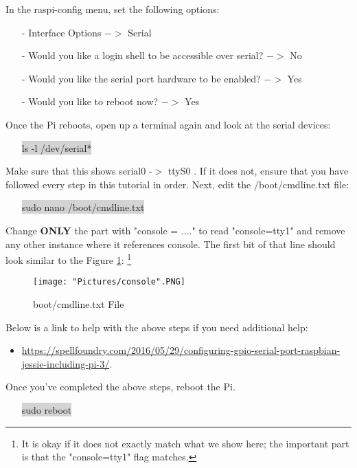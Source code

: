 \documentclass{article}
\begin{document}
\noindent In the raspi-config menu, set the following options:
\begin{itemize}
	\item[-]  Interface Options $-> $ Serial 
	\item[-] Would you like a login shell to be accessible over serial? $->$ No
	\item[-] Would you like the serial port hardware to be enabled? $->$ Yes
	\item[-] Would you like to reboot now? $->$ Yes
\end{itemize} 
\noindent Once the Pi reboots, open up a terminal again and look at the serial devices:
\begin{itemize}
	\item[] \colorbox{lightgray}{ls -l /dev/serial*}
\end{itemize}
Make sure that this shows serial0 -$>$ ttyS0 . If it does not, ensure that you have followed every step in this tutorial in order. Next, edit the /boot/cmdline.txt file:
\begin{itemize}
	\item [] \colorbox{lightgray}{sudo nano /boot/cmdline.txt}
\end{itemize}

\noindent Change \textbf{ONLY} the part with "console = ...." to read "console=tty1" and remove any other instance where it references console. The first bit of that line should look similar to the Figure \ref{console}: \footnote{It is okay if it does not exactly match what we show here; the important part is that the "console=tty1" flag matches.}

\begin{figure}[H]
 	\centering
	\texttt{[image: "Pictures/console".PNG]}
 	\caption{boot/cmdline.txt File}
	\label{console}
\end{figure}

\noindent Below is a link to help with the above steps if you need additional help:
\begin{itemize}
	\item \href{https://spellfoundry.com/2016/05/29/configuring-gpio-serial-port-raspbian-jessie-including-pi-3/}{https://spellfoundry.com/2016/05/29/configuring-gpio-serial-port-raspbian-jessie-including-pi-3/}. 
\end{itemize}
\noindent Once you've completed the above steps, reboot the Pi.
\begin{itemize}
	\item[] \colorbox{lightgray}{sudo reboot}
\end{itemize}
\end{document}

